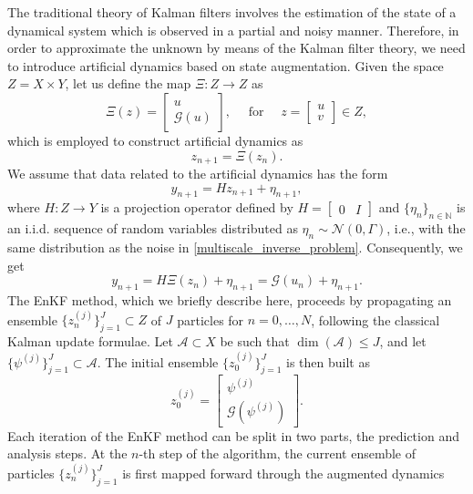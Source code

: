 \documentclass[10pt]{article}
\begin{document}
The traditional theory of Kalman filters involves the estimation of the state of a dynamical system which is observed in a partial and noisy manner. Therefore, in order to approximate the unknown by means of the Kalman filter theory, we need to introduce artificial dynamics based on state augmentation. Given the space $Z = X \times Y$, let us define the map $\Xi \colon Z \to Z$ as
\begin{equation}
	\Xi(z) = \begin{bmatrix} u \\ \mathcal G(u) \end{bmatrix}, \quad \text{ for } \quad z = \begin{bmatrix} u \\ v \end{bmatrix} \in Z,
\end{equation}
which is employed to construct artificial dynamics as
\begin{equation}\label{artificial_dynamics}
	z_{n+1} = \Xi(z_n).
\end{equation}
We assume that data related to the artificial dynamics has the form
\[ y_{n+1} = H z_{n+1} + \eta_{n+1}, \]
where $H \colon Z \to Y$ is a projection operator defined by $H = \begin{bmatrix} 0 & I \end{bmatrix}$ and $\{\eta_n \}_{n \in \mathbb{N}}$ is an i.i.d. sequence of random variables distributed as $\eta_n \sim \mathcal{N}(0,\Gamma)$, i.e., with the same distribution as the noise in \eqref{multiscale_inverse_problem}. Consequently, we get
\[ y_{n+1} = H \Xi(z_n) + \eta_{n+1} = \mathcal G(u_n) + \eta_{n+1}. \]
The EnKF method, which we briefly describe here, proceeds by propagating an ensemble $\{ z_n^{(j)} \}_{j = 1}^J \subset Z$ of $J$ particles for $n = 0, \ldots, N$, following the classical Kalman update formulae. Let $\mathcal A \subset X$ be such that $\dim(\mathcal A) \leq J$, and let $\{ \psi^{(j)} \}_{j = 1}^J \subset \mathcal A$. The initial ensemble $\{ z_0^{(j)} \}_{j = 1}^J$ is then built as
\begin{equation*}
z_0^{(j)} = \begin{bmatrix} \psi^{(j)} \\ \mathcal G(\psi^{(j)}) \end{bmatrix}.
\end{equation*}
Each iteration of the EnKF method can be split in two parts, the prediction and analysis steps. At the $n$-th step of the algorithm, the current ensemble of particles $\{ z_n^{(j)} \}_{j=1}^J$ is first mapped forward through the augmented dynamics
\end{document}
